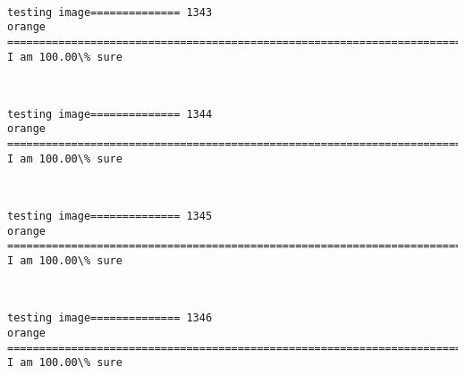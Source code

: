 \documentclass[11pt]{article}
\begin{document}
    \begin{center}
    \end{center}
    { \hspace*{\fill} \\}
    
    \begin{Verbatim}[commandchars=\\\{\}]
testing image============== 1343
orange
============================================================================
I am 100.00\% sure

    \end{Verbatim}

    \begin{center}
    \end{center}
    { \hspace*{\fill} \\}
    
    \begin{Verbatim}[commandchars=\\\{\}]
testing image============== 1344
orange
============================================================================
I am 100.00\% sure

    \end{Verbatim}

    \begin{center}
    \end{center}
    { \hspace*{\fill} \\}
    
    \begin{Verbatim}[commandchars=\\\{\}]
testing image============== 1345
orange
============================================================================
I am 100.00\% sure

    \end{Verbatim}

    \begin{center}
    \end{center}
    { \hspace*{\fill} \\}
    
    \begin{Verbatim}[commandchars=\\\{\}]
testing image============== 1346
orange
============================================================================
I am 100.00\% sure

    \end{Verbatim}
\end{document}
